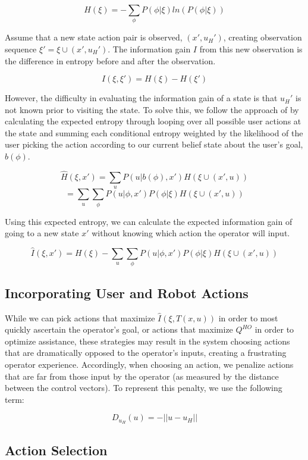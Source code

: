 \documentclass[conference]{IEEEtran}
\begin{document}
\[
H(\xi) = -\sum_\phi P(\phi|\xi)ln(P(\phi|\xi))
\]

Assume that a new state action pair is observed, $(x',u_H')$, creating observation sequence $\xi' = \xi \cup (x', u_H')$. The information gain $I$ from this new observation is the difference in entropy before and after the observation.

\[
I(\xi, \xi') = H(\xi) - H(\xi')
\]

However, the difficulty in evaluating the information gain of a state is that $u_H'$ is not known prior to visiting the state. To solve this, we follow the approach of \citet{holub2008entropy} by calculating the expected entropy through looping over all possible user actions at the state and summing each conditional entropy weighted by the likelihood of the user picking the action according to our current belief state about the user's goal, $b(\phi)$.

\[
\hat{H}(\xi, x') = \sum_u P(u|b(\phi),x')H(\xi \cup (x', u))
\]
\[
= \sum_u \sum_\phi P(u|\phi,x')P(\phi|\xi)H(\xi \cup (x', u))
\]

Using this expected entropy, we can calculate the expected information gain of going to a new state $x'$ without knowing which action the operator will input.

\[
\hat{I}(\xi, x') = H(\xi) - \sum_u \sum_\phi P(u|\phi,x')P(\phi|\xi)H(\xi \cup (x', u))
\]

\subsection{Incorporating User and Robot Actions}
While we can pick actions that maximize $\hat{I}(\xi, T(x,u))$ in order to most quickly ascertain the operator's goal, or actions that maximize $Q^{HO}$ in order to optimize assistance, these strategies may result in the system choosing actions that are dramatically opposed to the operator's inputs, creating a frustrating operator experience. Accordingly, when choosing an action, we penalize actions that are far from those input by the operator (as measured by the distance between the control vectors). To represent this penalty, we use the following term:

\[
D_{u_H}(u) = -||u - u_H||
\]


\subsection{Action Selection}
\end{document}
